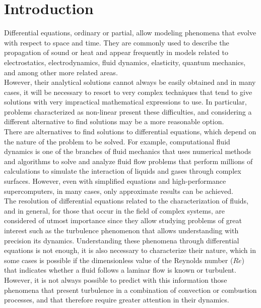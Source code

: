 \chapter{Introduction}
\label{Introduction}

	Differential equations, ordinary or partial, allow modeling phenomena that evolve with respect to space and time. They are commonly used to describe the propagation of sound or heat and appear frequently in models related to electrostatics, electrodynamics, fluid dynamics, elasticity, quantum mechanics, and among other more related areas. \\
	
	However, their analytical solutions cannot always be easily obtained and in many cases, it will be necessary to resort to very complex techniques that tend to give solutions with very impractical mathematical expressions to use. In particular, problems characterized as non-linear present these difficulties, and considering a different alternative to find solutions may be a more reasonable option. \\  
	
	There are alternatives to find solutions to differential equations, which depend on the nature of the problem to be solved. For example, computational fluid dynamics is one of the branches of fluid mechanics that uses numerical methods and algorithms to solve and analyze fluid flow problems that perform millions of calculations to simulate the interaction of liquids and gases through complex surfaces. However, even with simplified equations and high-performance supercomputers, in many cases, only approximate results can be achieved. \\
	
	The resolution of differential equations related to the characterization of fluids, and in general, for those that occur in the field of complex systems, are considered of utmost importance since they allow studying problems of great interest such as the turbulence phenomenon that allows understanding with precision its dynamics. Understanding these phenomena through differential equations is not enough, it is also necessary to characterize their nature, which in some cases is possible if the dimensionless value of the Reynolds number ($Re$) that indicates whether a fluid follows a laminar flow is known or turbulent. However, it is not always possible to predict with this information those phenomena that present turbulence in a combination of convection or combustion processes, and that therefore require greater attention in their dynamics. \\
	
